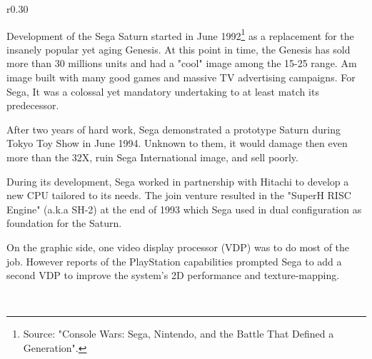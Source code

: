 \begin{wrapfigure}[10]{r}{0.30\textwidth}{
\centering {}}
\end{wrapfigure}
Development of the Sega Saturn started in June 1992\footnote{Source: "Console Wars: Sega, Nintendo, and the Battle That Defined a Generation".} as a replacement for the insanely popular yet aging Genesis. At this point in time, the Genesis has sold more than 30 millions units and had a "cool" image among the 15-25 range. Am image built with many good games and massive TV advertising campaigns. For Sega, It was a colossal yet mandatory undertaking to at least match its predecessor.\\
\label{saturn_port}
\par
After two years of hard work, Sega demonstrated a prototype Saturn during Tokyo Toy Show in June 1994. Unknown to them, it would damage then even more than the 32X, ruin Sega International image, and sell poorly.\\
\par
During its development, Sega worked in partnership with Hitachi to develop a new CPU tailored to its needs. The join venture resulted in the "SuperH RISC Engine" (a.k.a SH-2) at the end of 1993 which Sega used in dual configuration as foundation for the Saturn.\\
\par
 On the graphic side, one video display processor (VDP) was to do most of the job. However reports of the PlayStation capabilities prompted Sega to add a second VDP to improve the system's 2D performance and texture-mapping.\\
\par
{}\\

